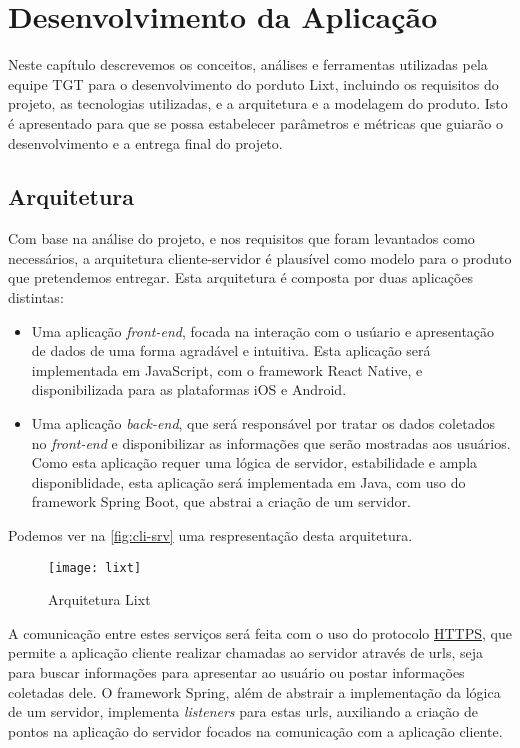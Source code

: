 \chapter{Desenvolvimento da Aplicação}

Neste capítulo descrevemos os conceitos, análises e ferramentas
utilizadas pela equipe TGT para o desenvolvimento do porduto Lixt,
incluindo os requisitos do projeto, as tecnologias utilizadas, e a
arquitetura e a modelagem do produto.
Isto é apresentado para que se possa estabelecer parâmetros e métricas
que guiarão o desenvolvimento e a entrega final do projeto.

\section{Arquitetura}
Com base na análise do projeto, e nos requisitos que foram levantados
como necessários, a arquitetura cliente-servidor é plausível como
modelo para o produto que pretendemos entregar.
Esta arquitetura é composta por duas aplicações distintas:
\begin{itemize}
\item Uma aplicação \emph{front-end}, focada na interação com o usúario
  e apresentação de dados de uma forma agradável e intuitiva. Esta
  aplicação será implementada em JavaScript, com o framework React
  Native, e disponibilizada para as plataformas iOS e Android.
\item Uma aplicação \emph{back-end}, que será responsável por tratar os
  dados coletados no \emph{front-end} e disponibilizar as informações
  que serão mostradas aos usuários. Como esta aplicação requer uma
  lógica de servidor, estabilidade e ampla disponiblidade, esta
  aplicação será implementada em Java, com uso do framework Spring
  Boot, que abstrai a criação de um servidor.
\end{itemize}
Podemos ver na \autoref{fig:cli-srv} uma respresentação desta
arquitetura.

\begin{figure}[h]
  \centering
  \texttt{[image: lixt]}
  \caption{Arquitetura Lixt}
  \label{fig:cli-srv}
\end{figure}

A comunicação entre estes serviços será feita com o uso do protocolo
\label{sig:https}\hyperlink{s:http}{HTTPS}, que permite a aplicação
cliente realizar chamadas ao servidor através de urls, seja para
buscar informações para apresentar ao usuário ou postar informações
coletadas dele. O framework Spring, além de abstrair a implementação
da lógica de um servidor, implementa \emph{listeners} para estas urls,
auxiliando a criação de pontos na aplicação do servidor focados na
comunicação com a aplicação cliente.

